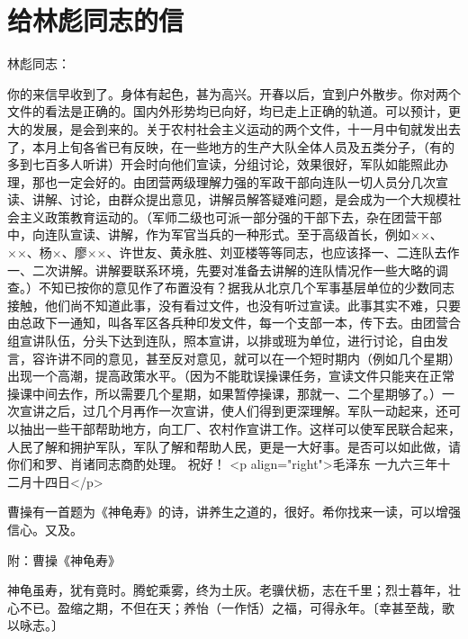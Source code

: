 \section[给林彪同志的信（一九六三年十二月十四日）]{给林彪同志的信}


林彪同志：

你的来信早收到了。身体有起色，甚为高兴。开春以后，宜到户外散步。你对两个文件的看法是正确的。国内外形势均已向好，均已走上正确的轨道。可以预计，更大的发展，是会到来的。关于农村社会主义运动的两个文件，十一月中旬就发出去了，本月上旬各省已有反映，在一些地方的生产大队全体人员及五类分子，（有的多到七百多人听讲）开会时向他们宣读，分组讨论，效果很好，军队如能照此办理，那也一定会好的。由团营两级理解力强的军政干部向连队一切人员分几次宣读、讲解、讨论，由群众提出意见，讲解员解答疑难问题，是会成为一个大规模社会主义政策教育运动的。（军师二级也可派一部分强的干部下去，杂在团营干部中，向连队宣读、讲解，作为军官当兵的一种形式。至于高级首长，例如××、××、杨×、廖××、许世友、黄永胜、刘亚楼等等同志，也应该择一、二连队去作一、二次讲解。讲解要联系环境，先要对准备去讲解的连队情况作一些大略的调查。）不知已按你的意见作了布置没有？据我从北京几个军事基层单位的少数同志接触，他们尚不知道此事，没有看过文件，也没有听过宣读。此事其实不难，只要由总政下一通知，叫各军区各兵种印发文件，每一个支部一本，传下去。由团营合组宣讲队伍，分头下达到连队，照本宣讲，以排或班为单位，进行讨论，自由发言，容许讲不同的意见，甚至反对意见，就可以在一个短时期内（例如几个星期）出现一个高潮，提高政策水平。（因为不能耽误操课任务，宣读文件只能夹在正常操课中间去作，所以需要几个星期，如果暂停操课，那就一、二个星期够了。）一次宣讲之后，过几个月再作一次宣讲，使人们得到更深理解。军队一动起来，还可以抽出一些干部帮助地方，向工厂、农村作宣讲工作。这样可以使军民联合起来，人民了解和拥护军队，军队了解和帮助人民，更是一大好事。是否可以如此做，请你们和罗、肖诸同志商酌处理。
祝好！
<p align="right">毛泽东
一九六三年十二月十四日</p>

曹操有一首题为《神龟寿》的诗，讲养生之道的，很好。希你找来一读，可以增强信心。又及。

附：曹操《神龟寿》

神龟虽寿，犹有竟时。腾蛇乘雾，终为土灰。老骥伏枥，志在千里；烈士暮年，壮心不已。盈缩之期，不但在天；养怡（一作恬）之福，可得永年。〔幸甚至哉，歌以咏志。〕


